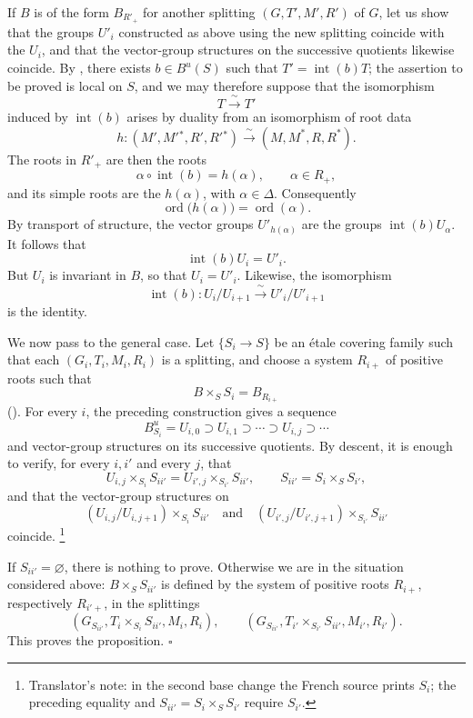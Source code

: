 If \(B\) is of the form \(B_{R'_+}\) for another splitting
\((G,T',M',R')\) of \(G\), let us show that the groups \(U'_i\)
constructed as above using the new splitting coincide with the
\(U_i\), and that the vector-group structures on the successive
quotients likewise coincide. By , there exists
\(b\in B^u(S)\) such that \(T'=\operatorname{int}(b)T\); the
assertion to be proved is local on \(S\), and we may therefore
suppose that the isomorphism
\[
  T\xrightarrow{\;\sim\;}T'
\]
induced by \(\operatorname{int}(b)\) arises by duality from an
isomorphism of root data
\[
  h:(M',M'{}^*,R',R'{}^*)
  \xrightarrow{\;\sim\;}
  (M,M^*,R,R^*).
\]
The roots in \(R'_+\) are then the roots
\[
  \alpha\circ\operatorname{int}(b)=h(\alpha),
  \qquad \alpha\in R_+,
\]
and its simple roots are the \(h(\alpha)\), with
\(\alpha\in\Delta\). Consequently
\[
  \operatorname{ord}\bigl(h(\alpha)\bigr)
  =
  \operatorname{ord}(\alpha).
\]
By transport of structure, the vector groups
\(U'_{h(\alpha)}\) are the groups
\(\operatorname{int}(b)U_\alpha\). It follows that
\[
  \operatorname{int}(b)U_i=U'_i.
\]
But \(U_i\) is invariant in \(B\), so that \(U_i=U'_i\).
Likewise, the isomorphism
\[
  \operatorname{int}(b):
  U_i/U_{i+1}\xrightarrow{\;\sim\;}U'_i/U'_{i+1}
\]
is the identity.

We now pass to the general case. Let \(\{S_i\to S\}\) be an étale
covering family such that each
\((G_i,T_i,M_i,R_i)\) is a splitting, and choose a system
\(R_{i+}\) of positive roots such that
\[
  B\times_S S_i=B_{R_{i+}}
\]
\textup{(\textup{})}. For every \(i\), the preceding
construction gives a sequence
\[
  B_{S_i}^u=U_{i,0}
  \supset U_{i,1}\supset\cdots
  \supset U_{i,j}\supset\cdots
\]
and vector-group structures on its successive quotients.
By descent, it is enough to verify, for every \(i,i'\) and every
\(j\), that
\[
  U_{i,j}\times_{S_i}S_{ii'}
  =
  U_{i',j}\times_{S_{i'}}S_{ii'},
  \qquad
  S_{ii'}=S_i\times_S S_{i'},
\]
and that the vector-group structures on
\[
  (U_{i,j}/U_{i,j+1})\times_{S_i}S_{ii'}
  \quad\text{and}\quad
  (U_{i',j}/U_{i',j+1})\times_{S_{i'}}S_{ii'}
\]
coincide.\begingroup
\renewcommand{\thefootnote}{*}\footnote{Translator's note: in the second
base change the French source prints \(S_i\); the preceding equality
and \(S_{ii'}=S_i\times_S S_{i'}\) require \(S_{i'}\).}
\addtocounter{footnote}{-1}\endgroup
If \(S_{ii'}=\varnothing\), there is nothing to prove. Otherwise we
are in the situation considered above: \(B\times_S S_{ii'}\) is
defined by the system of positive roots \(R_{i+}\), respectively
\(R_{i'+}\), in the splittings
\[
  (G_{S_{ii'}},
   T_i\times_{S_i}S_{ii'},M_i,R_i),
  \qquad
  (G_{S_{ii'}},
   T_{i'}\times_{S_{i'}}S_{ii'},M_{i'},R_{i'}).
\]
This proves the proposition.
\hfill\(\square\)

